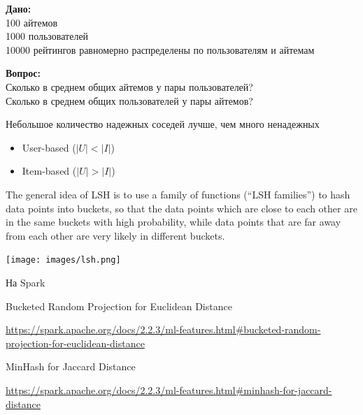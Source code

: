 \documentclass[11pt,aspectratio=169,handout]{beamer}
\begin{document}
\begin{frame}

{\bf Дано:} \\
100 айтемов \\
1000 пользователей \\
10000 рейтингов равномерно распределены по пользователям и айтемам \\

\vfill

{\bf Вопрос:} \\
Сколько в среднем общих айтемов у пары пользователей? \\
Сколько в среднем общих пользователей у пары айтемов? \\

\vfill

\begin{tcolorbox}[colback=gray!5,colframe=gray!80,title=]
Небольшое количество надежных соседей лучше, чем много ненадежных
\begin{itemize}
\item User-based ($|U| < |I|$)
\item Item-based  ($|U| > |I|$)
\end{itemize}
\end{tcolorbox}

\end{frame}

\begin{frame}

\begin{tcolorbox}[colback=gray!5,colframe=gray!80,title=Locality-Sensitive Hashing для приближенного поиска соседей]
The general idea of LSH is to use a family of functions (“LSH families”) to hash data points into buckets, so that the data points which are close to each other are in the same buckets with high probability, while data points that are far away from each other are very likely in different buckets.
\end{tcolorbox}

\begin{center}
\texttt{[image: images/lsh.png]}
\end{center}

\end{frame}

\begin{frame}{На Spark}

Bucketed Random Projection for Euclidean Distance

\url{https://spark.apache.org/docs/2.2.3/ml-features.html\#bucketed-random-projection-for-euclidean-distance}

\vfill

MinHash for Jaccard Distance

\url{https://spark.apache.org/docs/2.2.3/ml-features.html\#minhash-for-jaccard-distance}

\end{frame}
\end{document}
